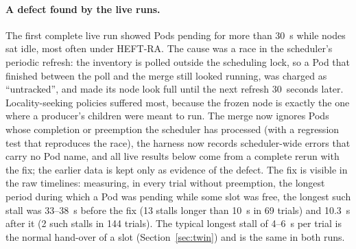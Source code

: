 \documentclass[12pt,a4paper]{report}
\begin{document}
\paragraph{A defect found by the live runs.} The first complete live run
showed Pods pending for more than 30~s while nodes sat idle, most often
under HEFT-RA. The cause was a race in the scheduler's periodic refresh: the
inventory is polled outside the scheduling lock, so a Pod that finished
between the poll and the merge still looked running, was charged as
``untracked'', and made its node look full until the next refresh
30~seconds later. Locality-seeking policies suffered most, because the
frozen node is exactly the one where a producer's children were meant to
run. The merge now ignores Pods whose completion or preemption the
scheduler has processed (with a regression test that reproduces the
race), the harness now records scheduler-wide errors that carry no Pod
name, and all live results below come from a complete rerun with the fix;
the earlier data is kept only as evidence of the defect. The fix is
visible in the raw timelines: measuring, in every trial without
preemption, the longest period during which a Pod was pending while some
slot was free, the longest such stall was 33--38~s before the fix (13
stalls longer than 10~s in 69 trials) and 10.3~s after it (2 such stalls
in 144 trials). The typical longest stall of 4--6~s per trial is the normal
hand-over of a slot (Section~\ref{sec:twin}) and is the same in both runs.
\end{document}
